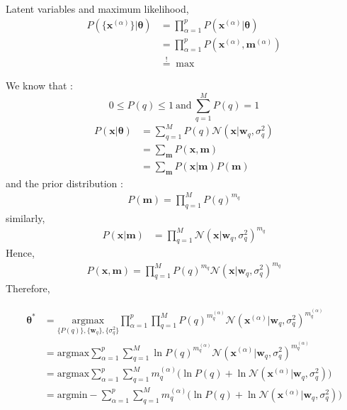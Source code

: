 Latent variables and maximum likelihood, 
\begin{align*}
 P(\{ \boldsymbol{x}^{(\alpha)} \} |  \boldsymbol{\theta} ) 
 &= \prod_{\alpha=1}^{p}  P(\boldsymbol{x}^{(\alpha)} |  \boldsymbol{\theta} ) \\
 &=  \prod_{\alpha=1}^{p}  P(\boldsymbol{x}^{(\alpha)} , \boldsymbol{m}^{(\alpha)}  )  \\
 &\stackrel{!}{=} \max 
\end{align*}

We know that :
$$
 	0 \le P(q) \le 1 \ \text{and} \ \sum_{q=1}^M P(q) = 1 	
$$
\begin{align*}
	P(\boldsymbol{x}| \boldsymbol{\theta} ) &= \sum_{q=1}^{M} P(q) \mathcal{N}( \boldsymbol{x} | \boldsymbol{w}_q, \sigma_q^2 ) \\
	&= \sum_{\boldsymbol{m}} P(\boldsymbol{x},  \boldsymbol{m}) \\
	&= \sum_{\boldsymbol{m}} P(\boldsymbol{x} | \boldsymbol{m}) P(\boldsymbol{m})
\end{align*}
and the prior distribution : 
\begin{align*}
	P(\boldsymbol{m}) = \prod_{q=1}^{M} P(q)^{m_q}
\end{align*}
similarly,
\begin{align*}
 P(\boldsymbol{x} | \boldsymbol{m}) &= \prod_{q=1}^{M} \mathcal{N}( \boldsymbol{x} | \boldsymbol{w}_q, \sigma_q^2 )^{m_q}
\end{align*}
Hence, 
\begin{align*}
	P(\boldsymbol{x}, \boldsymbol{m}) =\prod_{q=1}^{M} P(q)^{m_q} \mathcal{N}( \boldsymbol{x} | \boldsymbol{w}_q, \sigma_q^2 )^{m_q}
\end{align*}
Therefore,

\begin{align*}
\boldsymbol{\theta}^* &= \underset{ \{ P(q) \}, \{ \boldsymbol{w}_q \}, \{ \sigma^2_q \} }{\text{argmax}} \prod_{\alpha=1}^{p} \prod_{q=1}^{M} P(q)^{m_q^{(\alpha)}} \mathcal{N}( \boldsymbol{x}^{(\alpha)}| \boldsymbol{w}_q, \sigma_q^2 )^{m_q^{(\alpha)}}\\
&= \text{argmax} \sum_{\alpha=1}^{p} \sum_{q=1}^{M} \ln P(q)^{m_q^{(\alpha)}} \mathcal{N}( \boldsymbol{x}^{(\alpha)} | \boldsymbol{w}_q, \sigma_q^2 )^{m_q^{(\alpha)}}\\
&= \text{argmax} \sum_{\alpha=1}^{p} \sum_{q=1}^{M} m_q^{(\alpha)} \bigg ( \ln P(q) + \ln \mathcal{N}( \boldsymbol{x}^{(\alpha)} | \boldsymbol{w}_q, \sigma_q^2 ) \bigg)\\
&= \text{argmin} - \sum_{\alpha=1}^{p} \sum_{q=1}^{M} m_q^{(\alpha)} \bigg ( \ln P(q) + \ln \mathcal{N}( \boldsymbol{x}^{(\alpha)} | \boldsymbol{w}_q, \sigma_q^2 ) \bigg)\\
\end{align*}

